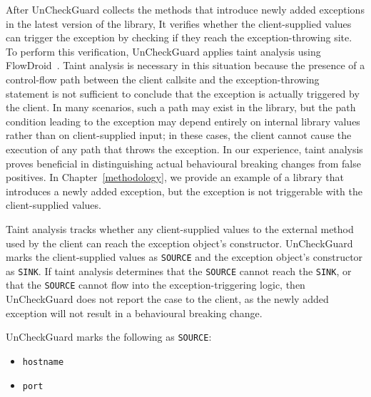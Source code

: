 After UnCheckGuard collects the methods that introduce newly added exceptions in the latest version of the library, It verifies whether the client-supplied values can trigger the exception by checking if they reach the exception-throwing site. To perform this verification, UnCheckGuard applies taint analysis using FlowDroid~\cite{Arzt14:_flowdroid}. Taint analysis is necessary in this situation because the presence of a control-flow path between the client callsite and the exception-throwing statement is not sufficient to conclude that the exception is actually triggered by the client. In many scenarios, such a path may exist in the library, but the path condition leading to the exception may depend entirely on internal library values rather than on client-supplied input; in these cases, the client cannot cause the execution of any path that throws the exception. In our experience, taint analysis proves beneficial in distinguishing actual behavioural breaking changes from false positives. In Chapter~\ref{methodology}, we provide an example of a library that introduces a newly added exception, but the exception is not triggerable with the client-supplied values.



Taint analysis tracks whether any client-supplied values to the external method used by the client can reach the exception object's constructor. UnCheckGuard marks the client-supplied values as \texttt{SOURCE} and the exception object's constructor as \texttt{SINK}. If taint analysis determines that the \texttt{SOURCE} cannot reach the \texttt{SINK}, or that the \texttt{SOURCE} cannot flow into the exception-triggering logic, then UnCheckGuard does not report the case to the client, as the newly added exception will not result in a behavioural breaking change.

UnCheckGuard marks the following as \texttt{SOURCE}:
\begin{itemize}
  \item \texttt{hostname}
  \item \texttt{port}
\end{itemize}

